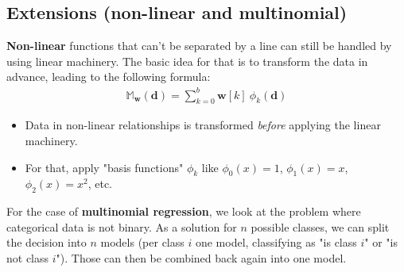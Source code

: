 \subsection{Extensions (non-linear and multinomial)}

\textbf{Non-linear} functions that can't be separated by a line can still be handled by using linear machinery. The basic idea for that is to transform the data in advance, leading to the following formula:
\begin{align*}
  \mathbb{M}_\mathbf{w}(\mathbf{d}) = \sum_{k=0}^b \mathbf{w}[k]\ \phi_k(\mathbf{d})
\end{align*}
\begin{itemize}
  \item Data in non-linear relationships is transformed \textit{before} applying the linear machinery.
  \item For that, apply "basis functions" $\phi_k$ like $\phi_0(x) = 1$, $\phi_1(x) = x$, $\phi_2(x) = x^2$, etc.
\end{itemize}

For the case of \textbf{multinomial regression}, we look at the problem where categorical data is not binary. As a solution for $n$ possible classes, we can split the decision into $n$ models (per class $i$ one model, classifying as "is class $i$" or "is not class $i$"). Those can then be combined back again into one model.

